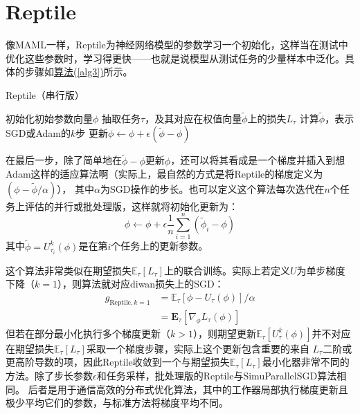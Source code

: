 \documentclass[11pt,twoside,a4paper]{ctexart}
\begin{document}
\section{Reptile}
像MAML一样，Reptile为神经网络模型的参数学习一个初始化，这样当在测试中优化这些参数时，学习得更快——也就是说模型从测试任务的少量样本中泛化。具体的步骤如\hyperref[alg3]{算法(\ref{alg3})}所示。
\begin{algorithm}
	\caption{Reptile（串行版）}
	\label{alg3}
	\begin{algorithmic}
		\State 初始化初始参数向量$\phi$
			\State 抽取任务$\tau$，及其对应在权值向量$\tilde{\phi}$上的损失$L_\tau$
			\State 计算$\tilde{\phi}$，表示SGD或Adam的$k$步
			\State 更新$\phi \gets \phi + \epsilon\left(\tilde{\phi}-\phi\right)$
		\EndFor
	\end{algorithmic}
\end{algorithm}
在最后一步，除了简单地在$\tilde{\phi}-\phi$更新$\phi$，还可以将其看成是一个梯度并插入到想Adam这样的适应算法啊（实际上，最自然的方式是将Reptile的梯度定义为$\left(\phi-\tilde{\phi}/\alpha\right)$），
其中$\alpha$为SGD操作的步长。也可以定义这个算法每次迭代在$n$个任务上评估的并行或批处理版，这样就将初始化更新为：
\begin{equation}
	\phi \gets \phi + \epsilon\frac1n\sum_{i=1}^{n}\left(\tilde{\phi}_i-\phi\right)
\end{equation}
其中$\tilde{\phi}=U_{\tau_i}^k(\phi)$是在第$i$个任务上的更新参数。

这个算法非常类似在期望损失$\mathbb E_\tau\left[L_\tau\right]$上的联合训练。实际上若定义$U$为单步梯度下降（$k=1$），则算法就对应diwan损失上的SGD：
\begin{align}
	g_{\text{Reptile},k=1} &= \mathbb E_\tau \left[\phi - U_\tau(\phi)\right] / \alpha\\
	                       &= \mathbf E_\tau \left[\nabla_\phi L_\tau(\phi)\right] 
\end{align}
但若在部分最小化执行多个梯度更新（$k>1$），则期望更新$\mathbb E_\tau \left[U_\tau^k(\phi)\right]$并不对应在期望损失$\mathbb E_\tau\left[L_\tau\right]$采取一个梯度步骤，实际上这个更新包含重要的来自
$L_\tau$二阶或更高阶导数的项，因此Reptile收敛到一个与期望损失$\mathbb E_\tau\left[L_\tau\right]$最小化器非常不同的方法。除了步长参数$\epsilon$和任务采样，批处理版的Reptile与SimuParallelSGD算法相同。
后者是用于通信高效的分布式优化算法，其中的工作器局部执行梯度更新且极少平均它们的参数，与标准方法将梯度平均不同。
\end{document}
